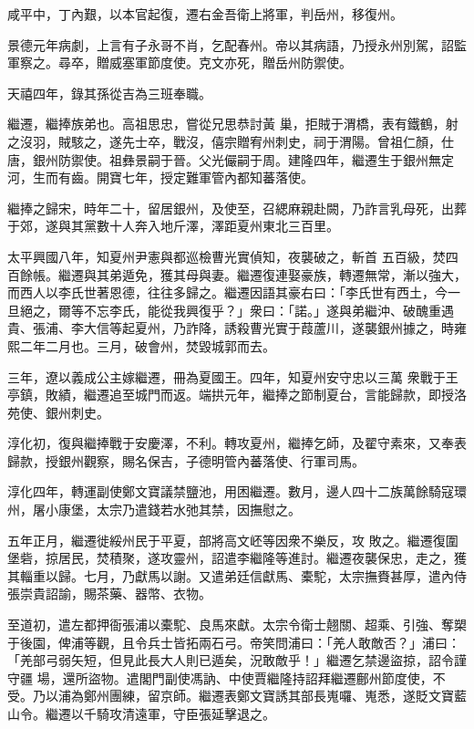 \begin{pinyinscope}
 咸平中，丁內艱，以本官起復，遷右金吾衛上將軍，判岳州，移復州。



 景德元年病劇，上言有子永哥不肖，乞配春州。帝以其病語，乃授永州別駕，詔監軍察之。尋卒，贈威塞軍節度使。克文亦死，贈岳州防禦使。



 天禧四年，錄其孫從吉為三班奉職。



 繼遷，繼捧族弟也。高祖思忠，嘗從兄思恭討黃
 巢，拒賊于渭橋，表有鐵鶴，射之沒羽，賊駭之，遂先士卒，戰沒，僖宗贈宥州刺史，祠于渭陽。曾祖仁顏，仕唐，銀州防禦使。祖彝景嗣于晉。父光儼嗣于周。建隆四年，繼遷生于銀州無定河，生而有齒。開寶七年，授定難軍管內都知蕃落使。



 繼捧之歸宋，時年二十，留居銀州，及使至，召緦麻親赴闕，乃詐言乳母死，出葬于郊，遂與其黨數十人奔入地斤澤，澤距夏州東北三百里。



 太平興國八年，知夏州尹憲與都巡檢曹光實偵知，夜襲破之，斬首
 五百級，焚四百餘帳。繼遷與其弟遁免，獲其母與妻。繼遷復連娶豪族，轉遷無常，漸以強大，而西人以李氏世著恩德，往往多歸之。繼遷因語其豪右曰：「李氏世有西土，今一旦絕之，爾等不忘李氏，能從我興復乎？」衆曰：「諾。」遂與弟繼沖、破醜重遇貴、張浦、李大信等起夏州，乃詐降，誘殺曹光實于葭蘆川，遂襲銀州據之，時雍熙二年二月也。三月，破會州，焚毀城郭而去。



 三年，遼以義成公主嫁繼遷，冊為夏國王。四年，知夏州安守忠以三萬
 衆戰于王亭鎮，敗績，繼遷追至城門而返。端拱元年，繼捧之節制夏台，言能歸款，即授洛苑使、銀州刺史。



 淳化初，復與繼捧戰于安慶澤，不利。轉攻夏州，繼捧乞師，及翟守素來，又奉表歸款，授銀州觀察，賜名保吉，子德明管內蕃落使、行軍司馬。



 淳化四年，轉運副使鄭文寶議禁鹽池，用困繼遷。數月，邊人四十二族萬餘騎寇環州，屠小康堡，太宗乃遣錢若水弛其禁，因撫慰之。



 五年正月，繼遷徙綏州民于平夏，部將高文岯等因衆不樂反，攻
 敗之。繼遷復圍堡砦，掠居民，焚積聚，遂攻靈州，詔遣李繼隆等進討。繼遷夜襲保忠，走之，獲其輜重以歸。七月，乃獻馬以謝。又遣弟廷信獻馬、橐駝，太宗撫賚甚厚，遣內侍張崇貴詔諭，賜茶藥、器幣、衣物。



 至道初，遣左都押衙張浦以橐駝、良馬來獻。太宗令衛士翹關、超乘、引強、奪槊于後園，俾浦等觀，且令兵士皆拓兩石弓。帝笑問浦曰：「羌人敢敵否？」浦曰：「羌部弓弱矢短，但見此長大人則已遁矣，況敢敵乎！」繼遷乞禁邊盜掠，詔令謹守疆
 場，還所盜物。遣閣門副使馮訥、中使賈繼隆持詔拜繼遷鄜州節度使，不受。乃以浦為鄭州團練，留京師。繼遷表鄭文寶誘其部長嵬囉、嵬悉，遂貶文寶藍山令。繼遷以千騎攻清遠軍，守臣張延擊退之。




\end{pinyinscope}
